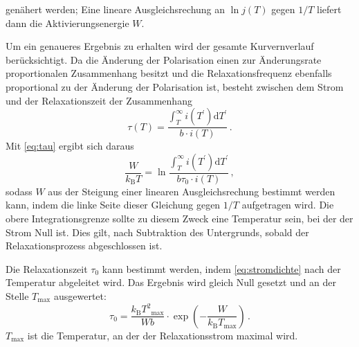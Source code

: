 genähert werden; Eine lineare Ausgleichsrechung an $\ln{j(T)}$ gegen $1/T$ liefert dann die Aktivierungsenergie $W$.\par
Um ein genaueres Ergebnis zu erhalten wird der gesamte Kurvernverlauf berücksichtigt. Da die Änderung der Polarisation einen zur Änderungsrate proportionalen Zusammenhang besitzt und die Relaxationsfrequenz ebenfalls proportional zu der Änderung der Polarisation ist, besteht zwischen dem Strom und der Relaxationszeit der Zusammenhang
\begin{equation}
  \tau(T) = \frac{\int_{T}^{\infty} i(T^\prime) \text{d}T^\prime}{b \cdot i(T)}\,.
\end{equation}
Mit \autoref{eq:tau} ergibt sich daraus
\begin{equation}
  \frac{W}{k_\text{B}T} = \ln{\frac{\int_{T}^{\infty} i(T^\prime) \text{d}T^\prime}{b \tau_0 \cdot i(T)}}\,,
  \label{eq:meth2}
\end{equation}
sodass $W$ aus der Steigung einer linearen Ausgleichsrechung bestimmt werden kann, indem die linke Seite dieser Gleichung gegen $1/T$ aufgetragen wird. Die obere Integrationsgrenze sollte zu diesem Zweck eine Temperatur sein, bei der der Strom Null ist. Dies gilt, nach Subtraktion des Untergrunds, sobald der Relaxationsprozess abgeschlossen ist.\par
Die Relaxationszeit $\tau_0$ kann bestimmt werden, indem \autoref{eq:stromdichte} nach der Temperatur abgeleitet wird. Das Ergebnis wird gleich Null gesetzt und an der Stelle $T_\text{max}$ ausgewertet:
\begin{equation}
  \tau_0 = \frac{k_\text{B} {T^2}_\text{max}}{W b} \cdot \exp{\left(- \frac{W}{k_\text{B} T_\text{max}}\right)}\,.
  \label{eq:tau0}
\end{equation}
$T_\text{max}$ ist die Temperatur, an der der Relaxationsstrom maximal wird.
